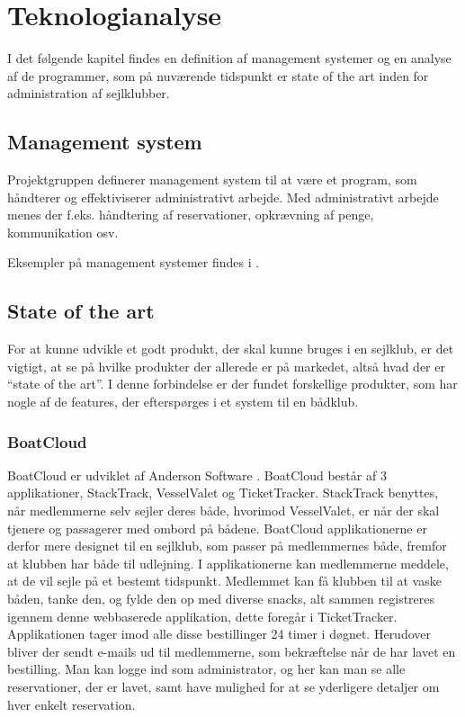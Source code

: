 \chapter{Teknologianalyse}\label{chap:teknologi-analyse}

I det følgende kapitel findes en definition af management systemer og en analyse af de programmer, som på nuværende tidspunkt er state of the art inden for administration af sejlklubber.

\section{Management system}\label{subsec:management-systemer}
Projektgruppen definerer management system til at være et program, som håndterer og effektiviserer administrativt arbejde.
Med administrativt arbejde menes der f.eks. håndtering af reservationer, opkrævning af penge, kommunikation osv.

Eksempler på management systemer findes i .

\section{State of the art}\label{sec:sota}

For at kunne udvikle et godt produkt, der skal kunne bruges i en sejlklub, er det vigtigt, at se på hvilke produkter der allerede er på markedet, altså hvad der er ``state of the art''. 
I denne forbindelse er der fundet forskellige produkter, som har nogle af de features, der efterspørges i et system til en bådklub.


\subsection*{BoatCloud}

BoatCloud er udviklet af Anderson Software \citep{BoatCloud}.
BoatCloud består af 3 applikationer, StackTrack, VesselValet og TicketTracker.
StackTrack benyttes, når medlemmerne selv sejler deres både, hvorimod VesselValet, er når der skal tjenere og passagerer med ombord på bådene. 
BoatCloud applikationerne er derfor mere designet til en sejlklub, som passer på medlemmernes både, fremfor at klubben har både til udlejning. 
I applikationerne kan medlemmerne meddele, at de vil sejle på et bestemt tidspunkt. 
Medlemmet kan få klubben til at vaske båden, tanke den, og fylde den op med diverse snacks, alt sammen registreres igennem denne webbaserede applikation, dette foregår i TicketTracker. 
Applikationen tager imod alle disse bestillinger 24 timer i døgnet. 
Herudover bliver der sendt e-mails ud til medlemmerne, som bekræftelse når de har lavet en bestilling.
Man kan logge ind som administrator, og her kan man se alle reservationer, der er lavet, samt have mulighed for at se yderligere detaljer om hver enkelt reservation.


